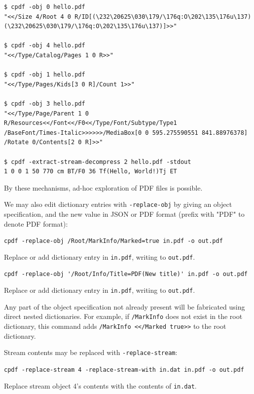\documentclass{book}
\begin{document}
{\small\begin{verbatim}
$ cpdf -obj 0 hello.pdf
"<</Size 4/Root 4 0 R/ID[(\232\20625\030\179/\176q:O\202\135\176u\137)
(\232\20625\030\179/\176q:O\202\135\176u\137)]>>"

$ cpdf -obj 4 hello.pdf
"<</Type/Catalog/Pages 1 0 R>>"

$ cpdf -obj 1 hello.pdf
"<</Type/Pages/Kids[3 0 R]/Count 1>>"

$ cpdf -obj 3 hello.pdf
"<</Type/Page/Parent 1 0 R/Resources<</Font<</F0<</Type/Font/Subtype/Type1
/BaseFont/Times-Italic>>>>>>/MediaBox[0 0 595.275590551 841.88976378]
/Rotate 0/Contents[2 0 R]>>"

$ cpdf -extract-stream-decompress 2 hello.pdf -stdout
1 0 0 1 50 770 cm BT/F0 36 Tf(Hello, World!)Tj ET
\end{verbatim}}

\noindent By these mechanisms, ad-hoc exploration of PDF files is possible.

We may also edit dictionary entries with \texttt{-replace-obj} by giving an object specification, and the new value in JSON or PDF format (prefix with "PDF" to denote PDF format):

  \begin{framed}
  \small\noindent\verb!cpdf -replace-obj /Root/MarkInfo/Marked=true in.pdf -o out.pdf!

  \vspace{2.5mm}
  \noindent Replace or add dictionary entry in \texttt{in.pdf}, writing to \texttt{out.pdf}. 

  \vspace{2.5mm}

  \small\noindent\verb!cpdf -replace-obj '/Root/Info/Title=PDF(New title)' in.pdf -o out.pdf!

  \vspace{2.5mm}
  \noindent Replace or add dictionary entry in \texttt{in.pdf}, writing to \texttt{out.pdf}. 

  \end{framed}

\noindent Any part of the object specification not already present will be fabricated using direct nested dictionaries. For example, if \texttt{/MarkInfo} does not exist in the root dictionary, this command adds \texttt{/MarkInfo <</Marked true>>} to the root dictionary.

Stream contents may be replaced with \texttt{-replace-stream}:

  \begin{framed}
  \small\noindent\verb!cpdf -replace-stream 4 -replace-stream-with in.dat in.pdf -o out.pdf!

  \vspace{2.5mm}
  \noindent Replace stream object 4's contents with the contents of \texttt{in.dat}. 

  \end{framed}
\end{document}
